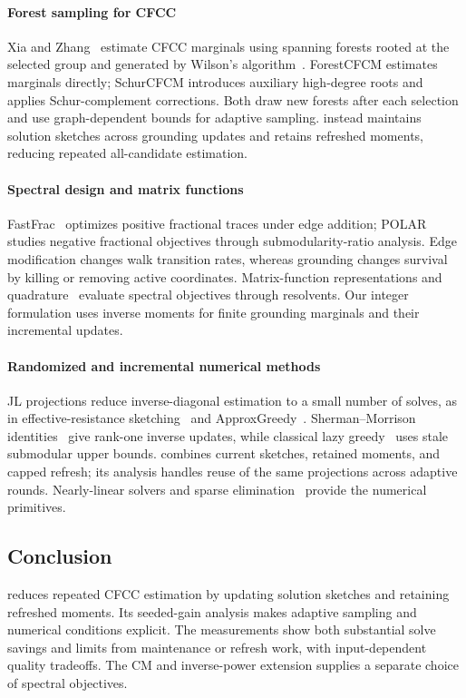 \paragraph{Forest sampling for CFCC}
Xia and Zhang~\cite{xia2025} estimate CFCC marginals using spanning
forests rooted at the selected group and generated by Wilson's
algorithm~\cite{wilson1996}. ForestCFCM estimates marginals directly;
SchurCFCM introduces auxiliary high-degree roots and applies
Schur-complement corrections. Both draw new forests after each
selection and use graph-dependent bounds for adaptive sampling.
\alg{} instead maintains solution sketches across grounding updates
and retains refreshed moments, reducing repeated all-candidate
estimation.

\paragraph{Spectral design and matrix functions}
FastFrac~\cite{fastfrac} optimizes positive fractional traces under
edge addition; POLAR~\cite{polar} studies negative fractional
objectives through submodularity-ratio analysis. Edge modification
changes walk transition rates, whereas grounding changes survival by
killing or removing active coordinates. Matrix-function representations
and quadrature~\cite{golub2010} evaluate spectral objectives through
resolvents. Our integer formulation uses inverse moments for finite
grounding marginals and their incremental updates.

\paragraph{Randomized and incremental numerical methods}
JL projections reduce inverse-diagonal estimation to a small number
of solves, as in effective-resistance sketching~\cite{ss2011} and
ApproxGreedy~\cite{li2019}. Sherman--Morrison
identities~\cite{sherman1950} give rank-one inverse updates, while
classical lazy greedy~\cite{leskovec2007} uses stale submodular
upper bounds. \alg{} combines current sketches, retained moments,
and capped refresh; its analysis handles reuse of the same
projections across adaptive rounds. Nearly-linear solvers and sparse
elimination~\cite{spielman2014,kyng2016} provide the numerical
primitives.

\begin{samepage}
\section{Conclusion}
\alg{} reduces repeated CFCC estimation by updating solution sketches
and retaining refreshed moments. Its seeded-gain analysis makes
adaptive sampling and numerical conditions explicit. The measurements
show both substantial solve savings and limits from
maintenance or refresh work, with input-dependent quality tradeoffs.
The CM and inverse-power extension supplies a separate choice of
spectral objectives.
\par\end{samepage}

